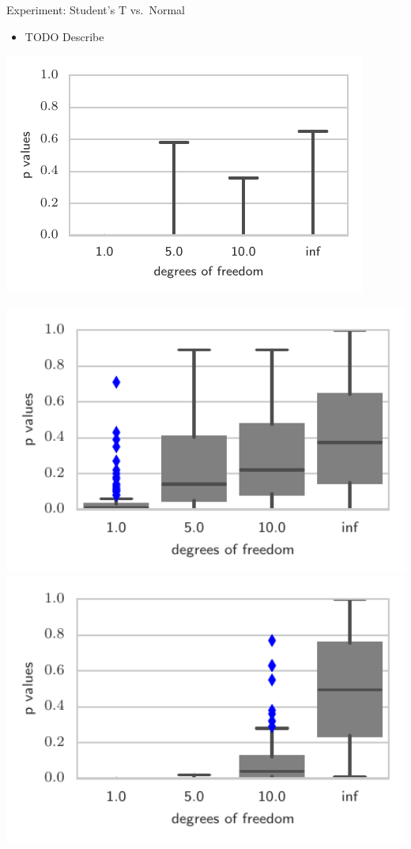 \begin{frame}
\begin{columns}
\hspace{-1.45cm}
\begin{column}{.32\linewidth}
\begin{block}{Experiment: Student's T vs.\ Normal}
\begin{minipage}{.60\linewidth}
\begin{itemize}
\item TODO Describe
\end{itemize}
\includegraphics[width=.7\textwidth]{../../presentation/img/sgld_student_bad}
\end{minipage}
\begin{minipage}{.35\linewidth}
\includegraphics[width=1\textwidth]{../../presentation/img/sgld_student}\\
 \includegraphics[width=1\textwidth]{../../presentation/img/sgld_student_opt} 

\end{minipage}
\end{block}
\end{column}
\end{columns}
\end{frame}
